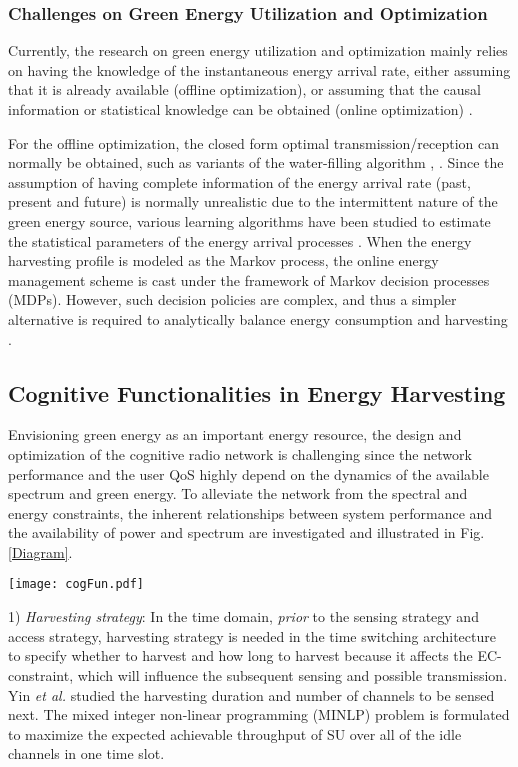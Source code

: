\documentclass[journal,12pt,onecolumn]{IEEEtran}
\begin{document}
\subsubsection{Challenges on Green Energy Utilization and Optimization}
Currently, the research on green energy utilization and optimization mainly relies on having the knowledge of the instantaneous energy arrival rate, either assuming that it is already available (offline optimization), or assuming that the causal information or statistical knowledge can be obtained (online optimization) \cite{6710085}.

For the offline optimization, the closed form optimal transmission/reception can normally be obtained, such as variants of the water-filling algorithm \cite{6202352}, \cite{5992841}. Since the assumption of having complete information of the energy arrival rate (past, present and future) is normally unrealistic due to the intermittent nature of the green energy source, various learning algorithms have been studied to estimate the statistical parameters of the energy arrival processes \cite{6477834}. When the energy harvesting profile is modeled as the Markov process, the online energy management scheme is cast under the framework of Markov decision processes (MDPs). However, such decision policies are complex, and thus a simpler alternative is required to analytically balance energy consumption and harvesting \cite{6710085}.
\subsection{Cognitive Functionalities in Energy Harvesting}
Envisioning green energy as an important energy resource, the design and optimization of the cognitive radio network is challenging since the network performance and the user QoS highly depend on the dynamics of the available spectrum and green energy. To alleviate the network from the spectral and energy constraints, the inherent relationships between system performance and the availability of power and spectrum are investigated and illustrated in Fig. \ref{Diagram}.

\begin{figure*}
\texttt{[image: cogFun.pdf]}
\caption{Cognitive functionalities in energy harvesting.}
\label{Diagram}
\end{figure*}

1) \emph{Harvesting strategy}: In the time domain, \emph{prior} to the sensing strategy and access strategy, harvesting strategy is needed in the time switching architecture to specify whether to harvest and how long to harvest because it affects the EC-constraint, which will influence the subsequent sensing and possible transmission. Yin \emph{et al.} \cite{6654965} studied the harvesting duration and number of channels to be sensed next. The mixed integer non-linear programming (MINLP) problem is formulated to maximize the expected achievable throughput of SU over all of the idle channels in one time slot.
\end{document}

